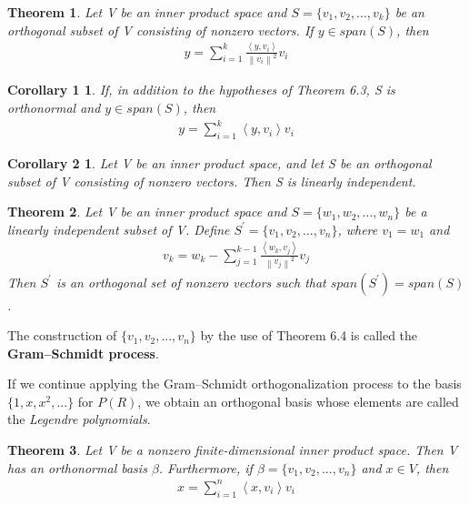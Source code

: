 \documentclass{article}
\newcommand{\norm}[1]{\left\lVert#1\right\rVert}
\newcommand{\bd}[1]{\textbf{#1}}
\newcommand{\ip}[1]{\left\langle {#1}\right\rangle} %
\theoremstyle{plain}
\newtheorem{theorem}{Theorem}[section]
\newtheorem*{corollary1}{Corollary 1}
\newtheorem*{corollary2}{Corollary 2}
\theoremstyle{plain} %
\begin{document}
\begin{theorem}
  Let V be an inner product space and $S = \{v_1, v_2,...,v_k\}$ be an orthogonal subset of V consisting of nonzero vectors. If $y \in span(S)$, then
  \begin{align*}
    y=\sum_{i=1}^k\frac{\ip{y, v_i}}{\norm{v_i}^2}v_i
  \end{align*}
\end{theorem}

\begin{corollary1}
  If, in addition to the hypotheses of Theorem 6.3, S is orthonormal and $y \in span(S)$, then
  \begin{align*}
    y=\sum_{i=1}^k \ip{y, v_i}v_i
  \end{align*}
\end{corollary1}

\begin{corollary2}
  Let V be an inner product space, and let S be an orthogonal subset of V consisting of nonzero vectors. Then S is linearly independent.
\end{corollary2}

\begin{theorem}
  Let V be an inner product space and $S = \{w_1, w_2,...,w_n\}$ be a linearly independent subset of V. Define $S^\prime = \{v_1, v_2,...,v_n\}$, where $v_1 = w_1$ and
  \begin{align*}
    v_k=w_k-\sum_{j=1}^{k-1}\frac{\ip{w_k, v_j}}{\norm{v_j}^2}v_j
  \end{align*}
  Then $S^\prime$ is an orthogonal set of nonzero vectors such that $span(S^\prime) = span(S)$.
\end{theorem}

The construction of $\{v_1, v_2,...,v_n\}$ by the use of Theorem 6.4 is called the \bd{Gram–Schmidt process}.

If we continue applying the Gram–Schmidt orthogonalization process to the basis $\{1, x, x^2,...\}$ for $P(R)$, we obtain an orthogonal basis whose elements are called the \textit{Legendre polynomials}.

\begin{theorem}
  Let V be a nonzero finite-dimensional inner product space. Then V has an orthonormal basis $\beta$. Furthermore, if $\beta = \{v_1, v_2,...,v_n\}$ and $x \in V$, then
  \begin{align*}
    x=\sum_{i=1}^n \ip{x, v_i}v_i
  \end{align*}
\end{theorem}
\end{document}
